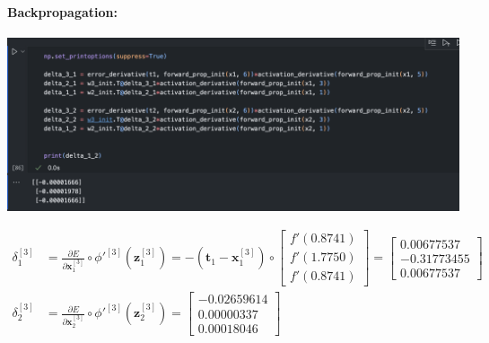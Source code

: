 \documentclass[12pt]{article}
\begin{document}
\begin{enumerate}[leftmargin=\labelsep]
    \paragraph{Backpropagation:}

    \begin{center}
        \includegraphics[scale=0.4]{images/code4.png}
    \end{center}

    \begin{equation}
    \begin{aligned}
        \delta_1^{[3]} &= \frac{\partial E}{\partial \mathbf{x}_1^{[3]}} \circ \phi'^{[3]}(\mathbf{z}_1^{[3]}) = -(\mathbf{t}_1 - \mathbf{x}_1^{[3]}) \circ \begin{bmatrix}            f'(0.8741) \\ f'(1.7750) \\ f'(0.8741)
        \end{bmatrix} = \begin{bmatrix}
            0.00677537 \\ -0.31773455 \\ 0.00677537
        \end{bmatrix} \\
        \delta_2^{[3]} &= \frac{\partial E}{\partial \mathbf{x}_2^{[3]}} \circ \phi'^{[3]}(\mathbf{z}_2^{[3]}) = \begin{bmatrix}
            -0.02659614 \\ 0.00000337 \\ 0.00018046
        \end{bmatrix}
    \end{aligned}
    \end{equation}


\end{enumerate}
\end{document}
